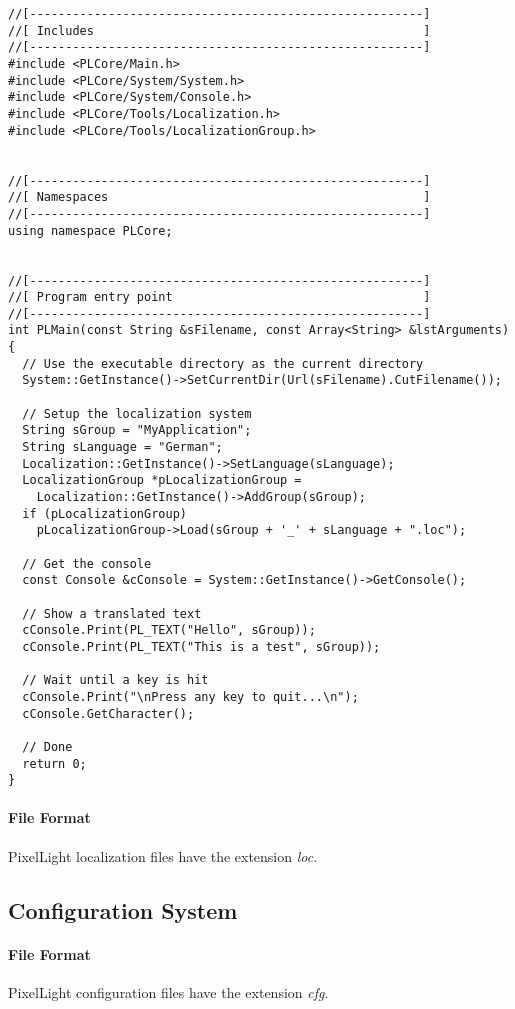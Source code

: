 \begin{lstlisting}[caption=Localization usage example]
//[-------------------------------------------------------]
//[ Includes                                              ]
//[-------------------------------------------------------]
#include <PLCore/Main.h>
#include <PLCore/System/System.h>
#include <PLCore/System/Console.h>
#include <PLCore/Tools/Localization.h>
#include <PLCore/Tools/LocalizationGroup.h>


//[-------------------------------------------------------]
//[ Namespaces                                            ]
//[-------------------------------------------------------]
using namespace PLCore;


//[-------------------------------------------------------]
//[ Program entry point                                   ]
//[-------------------------------------------------------]
int PLMain(const String &sFilename, const Array<String> &lstArguments)
{
  // Use the executable directory as the current directory
  System::GetInstance()->SetCurrentDir(Url(sFilename).CutFilename());

  // Setup the localization system
  String sGroup = "MyApplication";
  String sLanguage = "German";
  Localization::GetInstance()->SetLanguage(sLanguage);
  LocalizationGroup *pLocalizationGroup =
    Localization::GetInstance()->AddGroup(sGroup);
  if (pLocalizationGroup)
    pLocalizationGroup->Load(sGroup + '_' + sLanguage + ".loc");

  // Get the console
  const Console &cConsole = System::GetInstance()->GetConsole();

  // Show a translated text
  cConsole.Print(PL_TEXT("Hello", sGroup));
  cConsole.Print(PL_TEXT("This is a test", sGroup));

  // Wait until a key is hit
  cConsole.Print("\nPress any key to quit...\n");
  cConsole.GetCharacter();

  // Done
  return 0;
}
\end{lstlisting}


\paragraph{File Format}
PixelLight localization files have the extension \emph{loc}.




\subsection{Configuration System}


\paragraph{File Format}
PixelLight configuration files have the extension \emph{cfg}.
